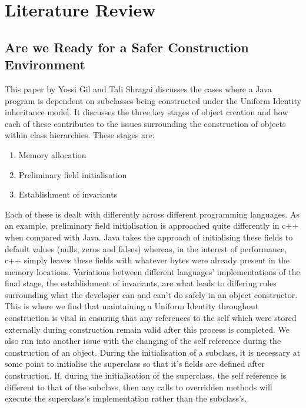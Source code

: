 \chapter{Literature Review}\label{C:us}

\section{Are we Ready for a Safer Construction Environment~\cite{SaferConstruction}}
This paper by Yossi Gil and Tali Shragai discusses the cases where a Java program is dependent on subclasses being constructed under the Uniform Identity inheritance model. It discusses the three key stages of object creation and how each of these contributes to the issues surrounding the construction of objects within class hierarchies. These stages are:
\begin{enumerate}
	\item Memory allocation
	\item Preliminary field initialisation
	\item Establishment of invariants
\end{enumerate}
Each of these is dealt with differently across different programming languages. As an example, preliminary field initialisation is approached quite differently in c++ when compared with Java. Java takes the approach of initialising these fields to default values (nulls, zeros and falses) whereas, in the interest of performance, c++ simply leaves these fields with whatever bytes were already present in the memory locations. \newline
Variations between different languages’ implementations of the final stage, the establishment of invariants, are what leads to differing rules surrounding what the developer can and can’t do safely in an object constructor. This is where we find that maintaining a Uniform Identity throughout construction is vital in ensuring that any references to the self which were stored externally during construction remain valid after this process is completed. \newline
We also run into another issue with the changing of the self reference during the construction of an object. During the initialisation of a subclass, it is necessary at some point to initialise the superclass so that it’s fields are defined after construction. If, during the initialisation of the superclass, the self reference is different to that of the subclass, then any calls to overridden methods will execute the superclass's implementation rather than the subclass’s.

